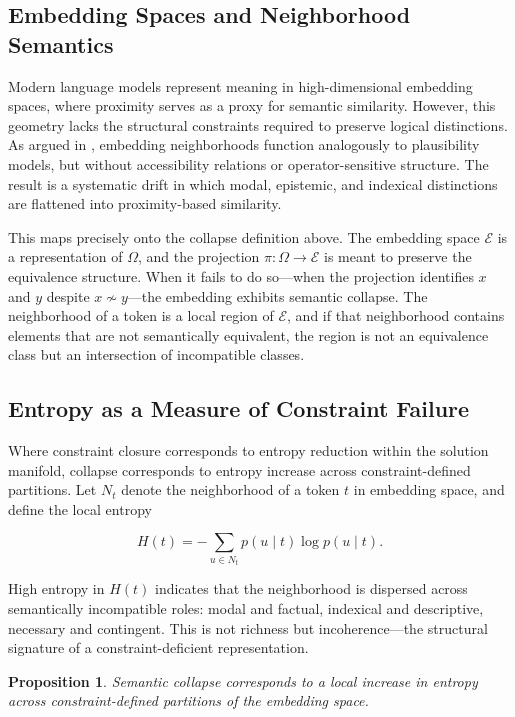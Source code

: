 \documentclass[11pt, twoside]{article}
\theoremstyle{plain}
\newtheorem{proposition}[theorem]{Proposition}
\theoremstyle{definition}
\theoremstyle{remark}
\begin{document}
\subsection{Embedding Spaces and Neighborhood Semantics}

Modern language models represent meaning in high-dimensional embedding spaces, where proximity serves as a proxy for semantic similarity. However, this geometry lacks the structural constraints required to preserve logical distinctions. As argued in \cite{denham2025collapse}, embedding neighborhoods function analogously to plausibility models, but without accessibility relations or operator-sensitive structure. The result is a systematic drift in which modal, epistemic, and indexical distinctions are flattened into proximity-based similarity.

This maps precisely onto the collapse definition above. The embedding space $\mathcal{E}$ is a representation of $\Omega$, and the projection $\pi : \Omega \to \mathcal{E}$ is meant to preserve the equivalence structure. When it fails to do so---when the projection identifies $x$ and $y$ despite $x \not\sim y$---the embedding exhibits semantic collapse. The neighborhood of a token is a local region of $\mathcal{E}$, and if that neighborhood contains elements that are not semantically equivalent, the region is not an equivalence class but an intersection of incompatible classes.

\subsection{Entropy as a Measure of Constraint Failure}

Where constraint closure corresponds to entropy reduction within the solution manifold, collapse corresponds to entropy increase across constraint-defined partitions. Let $N_t$ denote the neighborhood of a token $t$ in embedding space, and define the local entropy

\[
H(t) = -\sum_{u \in N_t} p(u \mid t) \log p(u \mid t).
\]

High entropy in $H(t)$ indicates that the neighborhood is dispersed across semantically incompatible roles: modal and factual, indexical and descriptive, necessary and contingent. This is not richness but incoherence---the structural signature of a constraint-deficient representation.

\begin{proposition}
Semantic collapse corresponds to a local increase in entropy across constraint-defined partitions of the embedding space.
\end{proposition}
\end{document}

